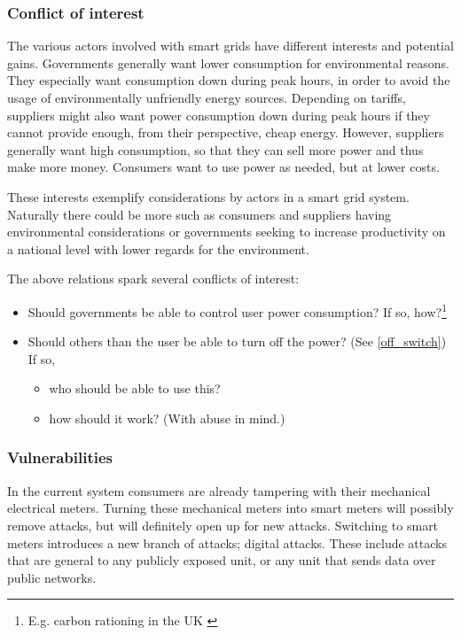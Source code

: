 \subsubsection{Conflict of interest}
The various actors involved with smart grids have different interests and potential gains.
Governments generally want lower consumption for environmental reasons.
They especially want consumption down during peak hours, in order to avoid the usage of environmentally unfriendly energy sources.
Depending on tariffs, suppliers might also want power consumption down during peak hours if they cannot provide enough, from their perspective, cheap energy.
However, suppliers generally want high consumption, so that they can sell more power and thus make more money.
Consumers want to use power as needed, but at lower costs.

These interests exemplify considerations by actors in a smart grid system.
Naturally there could be more such as consumers and suppliers having environmental considerations or governments seeking to increase productivity on a national level with lower regards for the environment.

The above relations spark several conflicts of interest:
\begin{itemize}
	\item Should governments be able to control user power consumption? If so, how?\footnote{E.g. carbon rationing in the UK \cite{security_economics}}
	\item Should others than the user be able to turn off the power? (See \cref{off_switch}) If so,
	\begin{itemize}
		\item who should be able to use this?
		\item how should it work? (With abuse in mind.)
	\end{itemize}	
\end{itemize}

\subsubsection{Vulnerabilities}
In the current system consumers are already tampering  with their mechanical electrical meters.
Turning these mechanical meters into smart meters will possibly remove attacks, but will definitely open up for new attacks.
Switching to smart meters introduces a new branch of attacks; digital attacks.
These include attacks that are general to any publicly exposed unit, or any unit that sends data over public networks.
